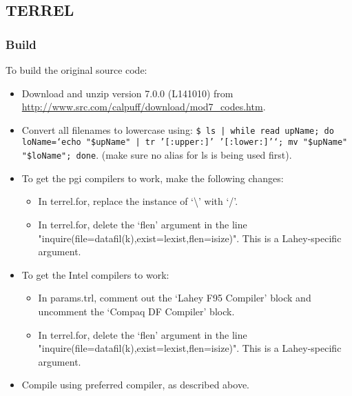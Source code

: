 \documentclass[10pt,a4paper]{article}
\begin{document}
\subsection{TERREL}
\subsubsection{Build}
To build the original source code:
\begin{itemize}
\item Download and unzip version 7.0.0 (L141010) from \url{http://www.src.com/calpuff/download/mod7_codes.htm}.
\item Convert all filenames to lowercase using: \texttt{\$ ls | while read upName; do loName=`echo "\${upName}" | tr '[:upper:]' '[:lower:]'`; mv "\$upName" "\$loName"; done}. (make sure no alias for ls is being used first).
\item To get the pgi compilers to work, make the following changes:
\begin{itemize}
\item In terrel.for, replace the instance of `\textbackslash' with `/'.
\item In terrel.for, delete the `flen' argument in the line "inquire(file=datafil(k),exist=lexist,flen=isize)". This is a Lahey-specific argument.
\end{itemize}
\item To get the Intel compilers to work:
\begin{itemize}
\item In params.trl, comment out the `Lahey F95 Compiler' block and uncomment the `Compaq DF Compiler' block.
\item In terrel.for, delete the `flen' argument in the line "inquire(file=datafil(k),exist=lexist,flen=isize)". This is a Lahey-specific argument.
\end{itemize}
\item Compile using preferred compiler, as described above.
\end{itemize}
\end{document}
